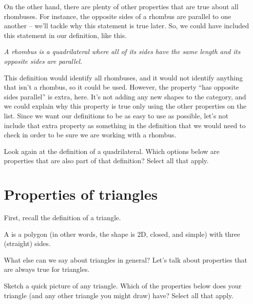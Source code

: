\documentclass{ximera}
\begin{document}
On the other hand, there are plenty of other properties that are true about all rhombuses. For instance, the opposite sides of a rhombus are parallel to one another -- we'll tackle why this statement is true later. So, we could have included this statement in our definition, like this.
\begin{center}
	\emph{A rhombus is a quadrilateral where all of its sides have the same length and its opposite sides are parallel.}
\end{center}
This definition would identify all rhombuses, and it would not identify anything that isn't a rhombus, so it could be used. However, the property ``has opposite sides parallel'' is extra, here. It's not adding any new shapes to the category, and we could explain why this property is true only using the other properties on the list. Since we want our definitions to be as easy to use as possible, let's not include that extra property as something in the definition that we would need to check in order to be sure we are working with a rhombus.

\begin{question}
Look again at the definition of a quadrilateral. Which options below are properties that are also part of that definition? Select all that apply.
\begin{selectAll}
\end{selectAll}
\end{question}

\section{Properties of triangles}

First, recall the definition of a triangle.
\begin{definition}
A  is a polygon (in other words, the shape is 2D, closed, and simple) with three (straight) sides.
\end{definition}

What else can we say about triangles in general? Let's talk about properties that are always true for triangles.

\begin{question}
Sketch a quick picture of any triangle. Which of the properties below does your triangle (and any other triangle you might draw) have? Select all that apply.
\begin{selectAll}
\end{selectAll}
\end{question}
\end{document}
